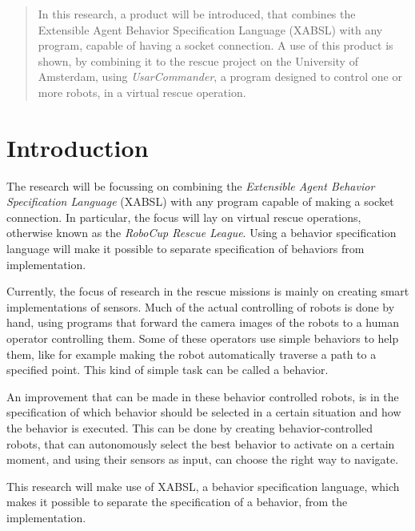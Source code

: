 \documentclass[a4paper,10pt]{article}
\begin{document}


\begin{abstract}
In this research, a product will be introduced, that combines the Extensible
Agent Behavior Specification Language (XABSL) with any program, capable of
having a socket connection. A use of this product is shown, by combining it to
the rescue project on the University of Amsterdam, using
\textit{UsarCommander},
a program designed to control one or more robots, in a virtual rescue operation.
\end{abstract}
\section{Introduction}
The research will be focussing on combining the \textit{Extensible Agent
Behavior Specification Language} (XABSL) with any program capable of making a
socket connection. In particular, the focus will lay on virtual rescue
operations, otherwise known as the \textit{RoboCup Rescue League}. Using a
behavior specification language will make it possible to separate specification
of behaviors from implementation.

Currently, the focus of research in the rescue missions is mainly on creating
smart implementations of sensors. Much of the actual controlling of robots is
done by hand, using programs that forward the camera images of the robots to a
human operator controlling them. Some of these operators use simple behaviors to
help them, like for example making the robot automatically traverse a path to a
specified point. This kind of simple task can be called a behavior.

An improvement that can be made in these behavior controlled robots, is in 
the specification of which behavior should be selected in a certain situation
and how the behavior is executed. This can be done by creating
behavior-controlled robots, that can autonomously select the best behavior to
activate on a certain moment, and using their sensors as input, can choose the
right way to navigate.

This research will make use of XABSL, a behavior specification language, which
makes it possible to separate the specification of a behavior, from the implementation.

%
\end{document}
